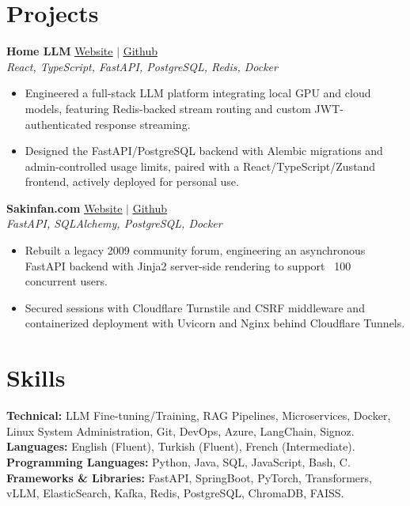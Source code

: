 \documentclass[paper=a4,fontsize=10pt]{scrartcl}
\begin{document}
\section*{Projects}
\textbf{Home LLM} \hfill \href{https://llm.yigittuncer.net}{\underline{Website}} $|$ \href{https://github.com/yigittuncer07/home-llm}{\underline{Github}}\\
\textit{React, TypeScript, FastAPI, PostgreSQL, Redis, Docker}
\begin{itemize}[noitemsep, topsep=2pt, parsep=0pt, partopsep=0pt, leftmargin=*]
    \item Engineered a full-stack LLM platform integrating local GPU and cloud models, featuring Redis-backed stream routing and custom JWT-authenticated response streaming.
    \item Designed the FastAPI/PostgreSQL backend with Alembic migrations and admin-controlled usage limits, paired with a React/TypeScript/Zustand frontend, actively deployed for personal use.
\end{itemize}

\textbf{Sakinfan.com} \hfill \href{https://sakinfan.com}{\underline{Website}} $|$ \href{https://github.com/yigittuncer07/sakinfan.com}{\underline{Github}}\\
\textit{FastAPI, SQLAlchemy, PostgreSQL, Docker}
\begin{itemize}[noitemsep, topsep=2pt, parsep=0pt, partopsep=0pt, leftmargin=*]
    \item Rebuilt a legacy 2009 community forum, engineering an asynchronous FastAPI backend with Jinja2 server-side rendering to support ~100 concurrent users.
    \item Secured sessions with Cloudflare Turnstile and CSRF middleware and containerized deployment with Uvicorn and Nginx behind Cloudflare Tunnels.
\end{itemize}

\section*{Skills}
\textbf{Technical:} LLM Fine-tuning/Training, RAG Pipelines, Microservices, Docker, Linux System Administration, Git, DevOps, Azure, LangChain, Signoz.\\
\textbf{Languages:} English (Fluent), Turkish (Fluent), French (Intermediate).\\
\textbf{Programming Languages:} Python, Java, SQL, JavaScript, Bash, C. \\
\textbf{Frameworks \& Libraries:} FastAPI, SpringBoot, PyTorch, Transformers, vLLM, ElasticSearch, Kafka, Redis, PostgreSQL, ChromaDB, FAISS.
\end{document}
